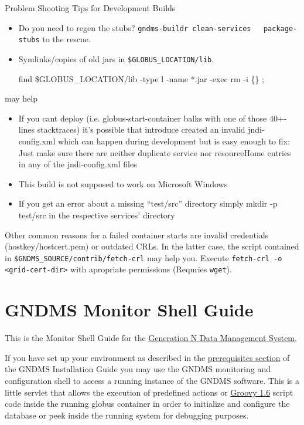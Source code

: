 \documentclass{article}
\begin{document}
Problem Shooting Tips for Development Builds

\begin{itemize}
\item
  Do you need to regen the stubs?
  \verb!gndms-buildr clean-services   package-stubs! to the rescue.

\item
  Symlinks/copies of old jars in \verb!$GLOBUS_LOCATION/lib!.

  find \$GLOBUS\_LOCATION/lib -type l -name *.jar -exec rm -i \{\} ;

\end{itemize}
may help

\begin{itemize}
\item
  If you cant deploy (i.e. globus-start-container balks with one of
  those 40+-lines stacktraces) it's possible that introduce created
  an invalid jndi-config.xml which can happen during development but
  is easy enough to fix: Just make sure there are neither duplicate
  service nor resourceHome entries in any of the jndi-config.xml
  files

\item
  This build is not supposed to work on Microsoft Windows

\item
  If you get an error about a missing ``test/src'' directory simply
  mkdir -p test/src in the respective services' directory

\end{itemize}
Other common reasons for a failed container starts are invalid
credentials (hostkey/hostcert.pem) or outdated CRLs. In the latter
case, the script contained in
\verb!$GNDMS_SOURCE/contrib/fetch-crl! may help you. Execute
\verb!fetch-crl -o <grid-cert-dir>! with apropriate permissions
(Requries \verb!wget!).

\section{GNDMS Monitor Shell Guide}

This is the Monitor Shell Guide for the \href{../index.html}{Generation N Data Management System}.

If you have set up your environment as described in the
\href{/installation-guide/#prerequisites}{prerequisites section} of
the GNDMS Installation Guide you may use the GNDMS monitoring and
configuration shell to access a running instance of the GNDMS
software. This is a little servlet that allows the execution of
predefined actions or \href{http://groovy.codehaus.org}{Groovy 1.6}
script code inside the running globus container in order to
initialize and configure the database or peek inside the running
system for debugging purposes.
\end{document}
